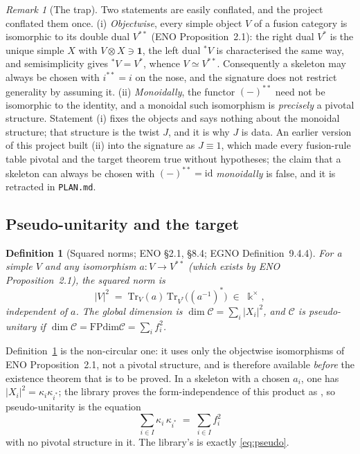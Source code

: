 \documentclass[11pt,a4paper]{article}
\newtheorem{definition}[theorem]{Definition}
\theoremstyle{remark}
\newtheorem{remark}[theorem]{Remark}
\newcommand{\code}[1]{\texttt{\detokenize{#1}}}
\newcommand{\C}{\mathcal{C}}
\newcommand{\FPdim}{\mathrm{FPdim}}
\newcommand{\one}{\mathbf{1}}
\newcommand{\field}{\Bbbk}
\begin{document}
\begin{remark}[The trap]\label{rem:trap}
Two statements are easily conflated, and the project conflated them once. (i) \emph{Objectwise},
every simple object $V$ of a fusion category is isomorphic to its double dual $V^{**}$ (ENO
Proposition~2.1): the right dual $V^*$ is the unique simple $X$ with $V \otimes X \ni \one$, the
left dual ${}^*V$ is characterised the same way, and semisimplicity gives ${}^*V = V^*$, whence
$V \simeq V^{**}$. Consequently a skeleton may always be chosen with $i^{**} = i$ on the nose,
and the signature does not restrict generality by assuming it. (ii) \emph{Monoidally}, the
functor $(-)^{**}$ need not be isomorphic to the identity, and a monoidal such isomorphism is
\emph{precisely} a pivotal structure. Statement (i) fixes the objects and says nothing about
the monoidal structure; that structure is the twist $J$, and it is why $J$ is data.
An earlier version of this project built (ii) into the signature as $J \equiv 1$, which made
every fusion-rule table pivotal and the target theorem true without hypotheses; the claim that
a skeleton can always be chosen with $(-)^{**} = \mathrm{id}$ \emph{monoidally} is false, and it
is retracted in \texttt{PLAN.md}.
\end{remark}

\subsection{Pseudo-unitarity and the target}

\begin{definition}[Squared norms; ENO \S2.1, \S8.4; EGNO Definition~9.4.4]\label{def:pseudo}
For a simple $V$ and any isomorphism $a \colon V \to V^{**}$ (which exists by ENO
Proposition~2.1), the \emph{squared norm} is
\[
|V|^{2} \;=\; \mathrm{Tr}_V(a)\,\mathrm{Tr}_{V^*}\bigl((a^{-1})^*\bigr) \;\in\; \field^{\times},
\]
independent of $a$. The \emph{global dimension} is $\dim \C = \sum_i |X_i|^{2}$, and $\C$ is
\emph{pseudo-unitary} if $\dim \C = \FPdim \C = \sum_i f_i^{2}$.
\end{definition}

Definition~\ref{def:pseudo} is the non-circular one: it uses only the objectwise isomorphisms of
ENO Proposition~2.1, not a pivotal structure, and is therefore available \emph{before} the
existence theorem that is to be proved. In a skeleton with a chosen $a_i$, one has
$|X_i|^{2} = \kappa_i \kappa_{i^*}$; the library proves the form-independence of this product as
\code{dim_mul_dim_dual}, so pseudo-unitarity is the equation
\begin{equation}\label{eq:pseudo}
\sum_{i \in I} \kappa_i \, \kappa_{i^*} \;=\; \sum_{i \in I} f_i^{2}
\end{equation}
with no pivotal structure in it. The library's \code{IsPseudoUnitary} is exactly
\eqref{eq:pseudo}.
\end{document}
